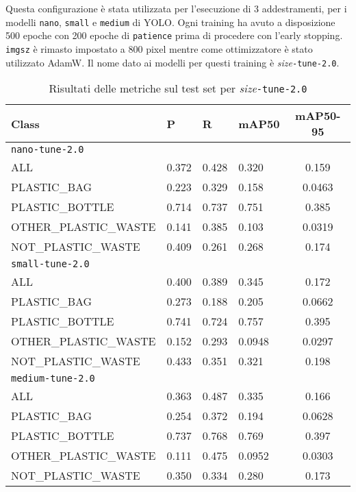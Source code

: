 Questa configurazione è stata utilizzata per l'esecuzione di 3 addestramenti, per i modelli
\texttt{nano}, \texttt{small} e \texttt{medium} di YOLO. Ogni training ha avuto a disposizione
500 epoche con 200 epoche di \texttt{patience} prima di procedere con l'early stopping. 
\texttt{imgsz} è rimasto impostato a 800 pixel mentre come ottimizzatore è stato utilizzato AdamW.
Il nome dato ai modelli per questi training è \textit{size}\texttt{-tune-2.0}.

\begin{table}[!htb]
    \centering
    \begin{tabularx}{\textwidth}{lYYYc}
        \toprule
        Class & P & R & mAP50 & mAP50-95 \\
        \midrule
        \texttt{nano-tune-2.0} \\
        \midrule
        ALL & 0.372 & 0.428 & 0.320 & 0.159 \\
        PLASTIC\_BAG & 0.223 & 0.329 & 0.158 & 0.0463 \\
        PLASTIC\_BOTTLE & 0.714 & 0.737 & 0.751 & 0.385 \\
        OTHER\_PLASTIC\_WASTE & 0.141 & 0.385 & 0.103 & 0.0319 \\
        NOT\_PLASTIC\_WASTE & 0.409 & 0.261 & 0.268 & 0.174 \\
        \midrule
        \texttt{small-tune-2.0} \\
        \midrule
        ALL & 0.400 & 0.389 & 0.345 & 0.172 \\
        PLASTIC\_BAG & 0.273 & 0.188 & 0.205 & 0.0662 \\
        PLASTIC\_BOTTLE & 0.741 & 0.724 & 0.757 & 0.395 \\
        OTHER\_PLASTIC\_WASTE & 0.152 & 0.293 & 0.0948 & 0.0297 \\
        NOT\_PLASTIC\_WASTE & 0.433 & 0.351 & 0.321 & 0.198 \\
        \midrule
        \texttt{medium-tune-2.0} \\
        \midrule
        ALL & 0.363 & 0.487 & 0.335 & 0.166 \\
        PLASTIC\_BAG & 0.254 & 0.372 & 0.194 & 0.0628 \\
        PLASTIC\_BOTTLE & 0.737 & 0.768 & 0.769 & 0.397 \\
        OTHER\_PLASTIC\_WASTE & 0.111 & 0.475 & 0.0952 & 0.0303 \\
        NOT\_PLASTIC\_WASTE & 0.350 & 0.334 & 0.280 & 0.173 \\
        \bottomrule
    \end{tabularx}
    \caption{Risultati delle metriche sul test set per \textit{size}\texttt{-tune-2.0}}
    \label{table:v6-2}
\end{table}